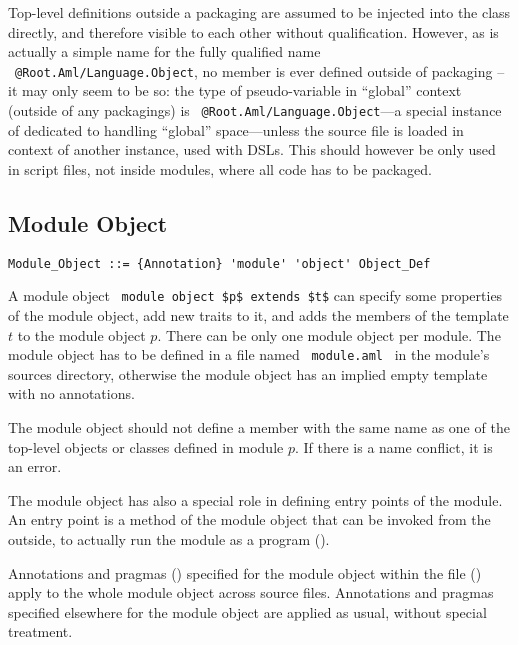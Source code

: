 Top-level definitions outside a packaging are assumed to be injected into the  class directly, and therefore visible to each other without qualification. However, as  is actually a simple name for the fully qualified name ~\lstinline!@Root.Aml/Language.Object!, no member is ever defined outside of packaging -- it may only seem to be so: the type of  pseudo-variable in ``global'' context (outside of any packagings) is ~\lstinline!@Root.Aml/Language.Object!---a special instance of  dedicated to handling ``global'' space---unless the source file is loaded in context of another instance, used with DSLs. This should however be only used in script files, not inside modules, where all code has to be packaged. 






\subsection{Module Object}

\syntax\begin{lstlisting}
Module_Object ::= {Annotation} 'module' 'object' Object_Def
\end{lstlisting}

A module object ~\lstinline!module object $p$ extends $t$! can specify some properties of the module object, add new traits to it, and adds the members of the template $t$ to the module object $p$. There can be only one module object per module. The module object has to be defined in a file named ~\lstinline[deletekeywords={module}]!module.aml!~ in the module's sources directory, otherwise the module object has an implied empty template with no annotations. 

The module object should not define a member with the same name as one of the top-level objects or classes defined in module $p$. If there is a name conflict, it is an error. 

The module object has also a special role in defining entry points of the module. An entry point is a method of the module object that can be invoked from the outside, to actually run the module as a program (). 

Annotations and pragmas () specified for the module object within the  file () apply to the whole module object across source files. Annotations and pragmas specified elsewhere for the module object are applied as usual, without special treatment. 






